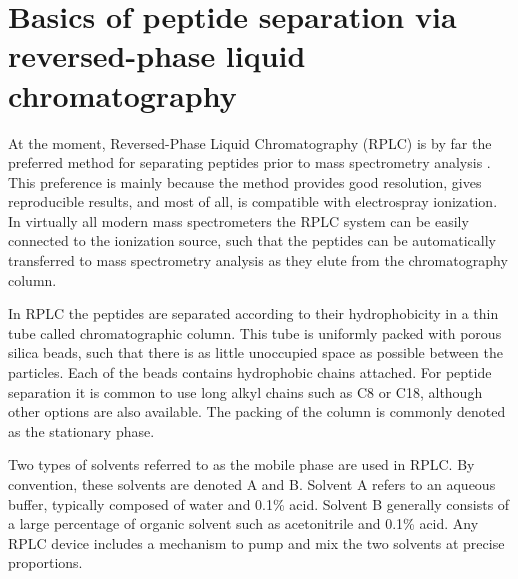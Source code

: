 \documentclass[a4paper]{article}
\begin{document}
\section{\label{sec:rplc}Basics of peptide separation via reversed-phase liquid chromatography}

At the moment, Reversed-Phase Liquid Chromatography (RPLC) is by far
the preferred method for separating peptides prior to mass
spectrometry analysis \cite{Xie201278}. This preference is mainly
because the method provides good resolution, gives reproducible
results, and most of all, is compatible with electrospray
ionization. In virtually all modern mass spectrometers the RPLC system
can be easily connected to the ionization source, such that the
peptides can be automatically transferred to mass spectrometry
analysis as they elute from the chromatography column.

In RPLC the peptides are separated according to their hydrophobicity
in a thin tube called chromatographic column. This tube is uniformly
packed with porous silica beads, such that there is as little
unoccupied space as possible between the particles. Each of the beads
contains hydrophobic chains attached. For peptide separation it is
common to use long alkyl chains such as C8 or C18, although other
options are also available. The packing of the column is commonly
denoted as the stationary phase.

Two types of solvents referred to as the mobile phase are used in
RPLC. By convention, these solvents are denoted A and B. Solvent A
refers to an aqueous buffer, typically composed of water and 0.1\%
acid. Solvent B generally consists of a large percentage of organic
solvent such as acetonitrile and 0.1\% acid. Any RPLC device includes
a mechanism to pump and mix the two solvents at precise proportions.
\end{document}
